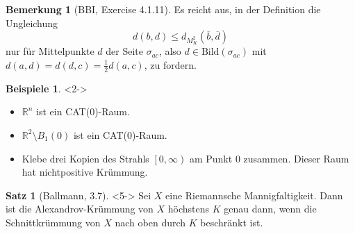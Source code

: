 \documentclass{beamer}
\newcommand{\R}{\mathbb{R}} %
\newcommand{\Bild}{\mathrm{Bild}} %
\theoremstyle{definition}
\newtheorem*{bspe}{Beispiele}
\newtheorem*{satz}{Satz}
\newtheorem*{bem}{Bemerkung}
\begin{document}
\begin{frame}
  \begin{bem}[BBI, Exercise 4.1.11]
    Es reicht aus, in der Definition die Ungleichung
    \[ d(b, d) \leq d_{M_K^2}(\overline{b}, \overline{d}) \]
    nur für Mittelpunkte $d$ der Seite $\sigma_{ac}$, also $d \in \Bild(\sigma_{ac})$ mit $d(a, d) = d(d, c) = \tfrac{1}{2} d(a, c)$, zu fordern.
  \end{bem}

  \begin{bspe}<2->
    \begin{itemize}
      \item<2-> $\R^n$ ist ein CAT(0)-Raum.
      \item<3-> $\R^2 \setminus B_1(0)$ ist ein CAT(0)-Raum.
      \item<4-> Klebe drei Kopien des Strahls $\left[0,\infty\right)$ am Punkt $0$ zusammen. Dieser Raum hat nichtpositive Krümmung.
    \end{itemize}
  \end{bspe}

  \begin{satz}[Ballmann, 3.7]<5->
    Sei $X$ eine Riemannsche Mannigfaltigkeit. Dann ist die Alexandrov-Krümmung von $X$ höchstens $K$ genau dann, wenn die Schnittkrümmung von $X$ nach oben durch $K$ beschränkt ist.
  \end{satz}
\end{frame}
\end{document}
